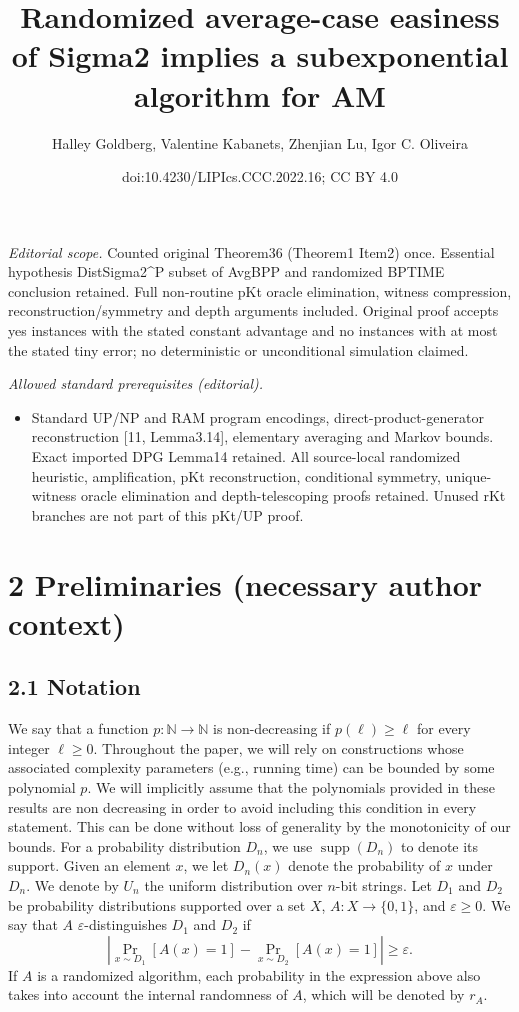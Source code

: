 \documentclass[10pt,a4paper]{article}
\title{Randomized average-case easiness of Sigma2 implies a subexponential algorithm for AM}
\author{Halley Goldberg, Valentine Kabanets, Zhenjian Lu, Igor C. Oliveira}
\date{doi:10.4230/LIPIcs.CCC.2022.16; CC BY 4.0}
\begin{document}
\maketitle
\noindent\textit{Editorial scope.} Counted original Theorem36 (Theorem1 Item2) once. Essential hypothesis DistSigma2\textasciicircum{}P subset of AvgBPP and randomized BPTIME conclusion retained. Full non-routine pKt oracle elimination, witness compression, reconstruction/symmetry and depth arguments included. Original proof accepts yes instances with the stated constant advantage and no instances with at most the stated tiny error; no deterministic or unconditional simulation claimed.\par\medskip
\noindent\textit{Allowed standard prerequisites (editorial).}\begin{itemize}
\item Standard UP/NP and RAM program encodings, direct-product-generator reconstruction [11, Lemma3.14], elementary averaging and Markov bounds. Exact imported DPG Lemma14 retained. All source-local randomized heuristic, amplification, pKt reconstruction, conditional symmetry, unique-witness oracle elimination and depth-telescoping proofs retained. Unused rKt branches are not part of this pKt/UP proof.
\end{itemize}\medskip
\section*{2 Preliminaries (necessary author context)}
\subsection*{2.1 Notation}
We say that a function $p:\mathbb N\to\mathbb N$ is non-decreasing if $p(\ell)\geq\ell$ for every integer $\ell\geq0$. Throughout the paper, we will rely on constructions whose associated complexity parameters (e.g., running time) can be bounded by some polynomial $p$. We will implicitly assume that the polynomials provided in these results are non decreasing in order to avoid including this condition in every statement. This can be done without loss of generality by the monotonicity of our bounds.
For a probability distribution $D_n$, we use $\operatorname{supp}(D_n)$ to denote its support. Given an element $x$, we let $D_n(x)$ denote the probability of $x$ under $D_n$. We denote by $U_n$ the uniform distribution over $n$-bit strings.
Let $D_1$ and $D_2$ be probability distributions supported over a set $X$, $A:X\to\{0,1\}$, and $\varepsilon\geq0$. We say that $A$ $\varepsilon$-distinguishes $D_1$ and $D_2$ if
\[\left|\Pr_{x\sim D_1}[A(x)=1]-\Pr_{x\sim D_2}[A(x)=1]\right|\geq\varepsilon.\]
If $A$ is a randomized algorithm, each probability in the expression above also takes into account the internal randomness of $A$, which will be denoted by $r_A$.
\end{document}
